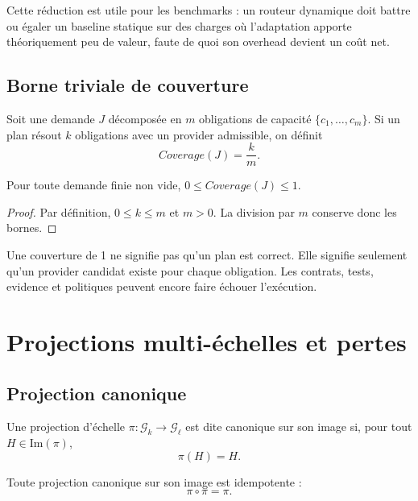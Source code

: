 \begin{observation}
Cette réduction est utile pour les benchmarks : un routeur dynamique doit battre ou égaler un baseline statique sur des charges où l'adaptation apporte théoriquement peu de valeur, faute de quoi son overhead devient un coût net.
\end{observation}

\section{Borne triviale de couverture}

Soit une demande $J$ décomposée en $m$ obligations de capacité $\{c_1,\dots,c_m\}$. Si un plan résout $k$ obligations avec un provider admissible, on définit
\[
Coverage(J)=\frac{k}{m}.
\]

\begin{proposition}
Pour toute demande finie non vide, $0\leq Coverage(J)\leq1$.
\end{proposition}

\begin{proof}
Par définition, $0\leq k\leq m$ et $m>0$. La division par $m$ conserve donc les bornes.
\end{proof}

\begin{limitation}
Une couverture de 1 ne signifie pas qu'un plan est correct. Elle signifie seulement qu'un provider candidat existe pour chaque obligation. Les contrats, tests, evidence et politiques peuvent encore faire échouer l'exécution.
\end{limitation}

\chapter{Projections multi-échelles et pertes}

\section{Projection canonique}

\begin{definition}
Une projection d'échelle $\pi: \mathcal G_k\to\mathcal G_\ell$ est dite canonique sur son image si, pour tout $H\in\mathrm{Im}(\pi)$,
\[
\pi(H)=H.
\]
\end{definition}

\begin{proposition}[Idempotence]
Toute projection canonique sur son image est idempotente :
\[
\pi\circ\pi=\pi.
\]
\end{proposition}

